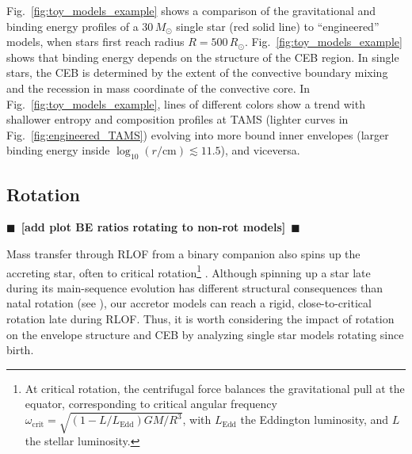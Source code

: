 \documentclass[twocolumn,twocolappendix,trackchanges]{aastex63}
\DeclareRobustCommand{\Figref}[1]{Fig.~\ref{#1}}
\newcommand{\todo}[1]{{\large $\blacksquare$~\textbf{\color{red}[#1]}}~$\blacksquare$}
\begin{document}
\Figref{fig:toy_models_example} shows a comparison of the
gravitational and binding energy profiles of a $30\,M_\odot$ single
star (red solid line) to
``engineered'' models, when stars first
reach radius $R=500\,R_\odot$. %
\Figref{fig:toy_models_example} shows that
binding energy depends on the structure of the CEB region. In single
stars, the CEB is determined by the extent of the convective boundary
mixing and the recession in mass coordinate of the
convective core. In \Figref{fig:toy_models_example}, lines of
different colors show a trend with shallower entropy and composition
profiles at TAMS (lighter curves in \Figref{fig:engineered_TAMS})
evolving into more bound inner envelopes (larger
binding energy inside $\log_{10}(r/\mathrm{cm})\lesssim 11.5$), and viceversa.

\subsection{Rotation}
\label{sec:rot_examples}

\todo{add plot BE ratios rotating to non-rot models}

Mass transfer through RLOF from a binary companion also spins up the
accreting star, often to critical rotation\footnote{At critical
  rotation, the centrifugal force
  balances the gravitational pull at the equator, corresponding to critical
  angular frequency
  $\omega_\mathrm{crit}=\sqrt{(1-L/L_\mathrm{Edd})GM/R^3}$, with $L_\mathrm{Edd}$ the Eddington
  luminosity, and $L$ the stellar luminosity.} \citep[e.g.,][]{lubow:1975,
  packet:1981, cantiello:2007}. Although spinning up a star late during its
main-sequence evolution has  different structural consequences than
natal rotation (see \citealt{renzo:2021zoph}), our accretor models can
reach a rigid, close-to-critical rotation late during RLOF.
Thus, it is worth considering the impact of rotation on the envelope
structure and CEB by analyzing single star models rotating since
birth.
\end{document}
